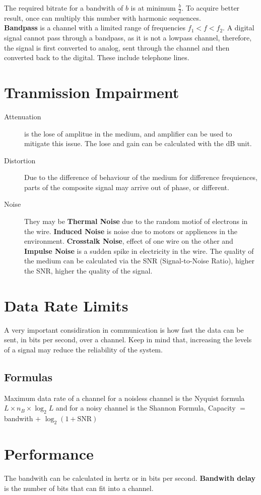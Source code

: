 \documentclass[11pt,a4paper,twoside]{book}
\begin{document}
The required bitrate for a bandwith of $b$ is at minimum $\frac{b}{2}$. To acquire better result, once can multiply this number with harmonic sequences.\\

\textbf{Bandpass} is a channel with a limited range of frequencies $f_1 < f < f_2$. A digital signal cannot pass through a bandpass, as it is not a lowpass channel, therefore, the signal is first converted to analog, sent through the channel and then converted back to the digital. These include telephone lines.\\

\section{Tranmission Impairment}

\begin{description}
\item[Attenuation] is the lose of amplitue in the medium, and amplifier can be used to mitigate this issue. The lose and gain can be calculated with the dB unit.
\item[Distortion] Due to the difference of behaviour of the medium for difference frequiences, parts of the composite signal may arrive out of phase, or different.\\
\item[Noise] They may be \textbf{Thermal  Noise} due to the random motiof of electrons in the wire. \textbf{Induced Noise} is noise due to motors or appliences in the environment. \textbf{Crosstalk Noise}, effect of one wire on the other and \textbf{Impulse Noise} is a sudden spike in electricity in the wire. The quality of the medium can be calculated via the SNR (Signal-to-Noise Ratio), higher the SNR, higher the quality of the signal.
\end{description}

\section{Data Rate Limits}

A very important considiration in communication is how fast the data can be sent, in bits per second, over a channel. Keep in mind that, increasing the levels of a signal may reduce the reliability of the system.

\subsection{Formulas}

Maximum data rate of a channel for a noisless channel is the Nyquist formula $L\times n_B \times \log_2 L$ \unsure and for a noisy channel is the Shannon Formula, Capacity $=$ bandwith $+$ $\log_2(1 + \text{SNR})$

\section{Performance}

The bandwith can be calculated in hertz or in bits per second. \textbf{Bandwith delay} is the number of bits that can fit into a channel.
\end{document}
